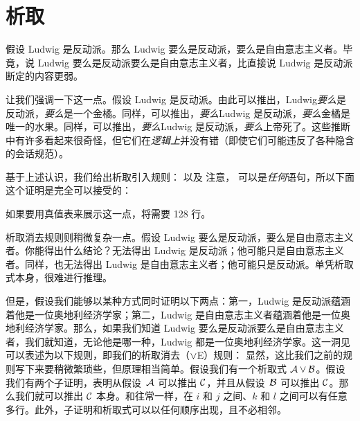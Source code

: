 \section{析取}
假设 Ludwig 是反动派。那么 Ludwig 要么是反动派，要么是自由意志主义者。毕竟，说 Ludwig 要么是反动派要么是自由意志主义者，比直接说 Ludwig 是反动派断定的内容更弱。

让我们强调一下这一点。假设 Ludwig 是反动派。由此可以推出，Ludwig\emph{要么}是反动派，\emph{要么}是一个金橘。同样，可以推出，\emph{要么}Ludwig 是反动派，\emph{要么}金橘是唯一的水果。同样，可以推出，\emph{要么}Ludwig 是反动派，\emph{要么}上帝死了。这些推断中有许多看起来很奇怪，但它们在\emph{逻辑上}并没有错（即使它们可能违反了各种隐含的会话规范）。

基于上述认识，我们给出析取引入规则：
以及
注意， 可以是\emph{任何}语句，所以下面这个证明是完全可以接受的：

\begin{fitchproof}
	\PR
\end{fitchproof}

如果要用真值表来展示这一点，将需要 128 行。

析取消去规则则稍微复杂一点。假设 Ludwig 要么是反动派，要么是自由意志主义者。你能得出什么结论？无法得出 Ludwig 是反动派；他可能只是自由意志主义者。同样，也无法得出 Ludwig 是自由意志主义者；他可能只是反动派。单凭析取式本身，很难进行推理。

但是，假设我们能够以某种方式同时证明以下两点：第一，Ludwig 是反动派蕴涵着他是一位奥地利经济学家；第二，Ludwig 是自由意志主义者蕴涵着他是一位奥地利经济学家。那么，如果我们知道 Ludwig 要么是反动派要么是自由意志主义者，我们就知道，无论他是哪一种，Ludwig 都是一位奥地利经济学家。这一洞见可以表述为以下规则，即我们的析取消去（$\vee$E）规则：
显然，这比我们之前的规则写下来要稍微繁琐些，但原理相当简单。假设我们有一个析取式 $\mathcal{A} \vee \mathcal{B}$。假设我们有两个子证明，表明从假设~$\mathcal{A}$ 可以推出 $\mathcal{C}$，并且从假设~$\mathcal{B}$ 可以推出 $\mathcal{C}$。那么我们就可以推出 $\mathcal{C}$ 本身。和往常一样，在 $i$ 和 $j$ 之间、$k$ 和 $l$ 之间可以有任意多行。此外，子证明和析取式可以以任何顺序出现，且不必相邻。

